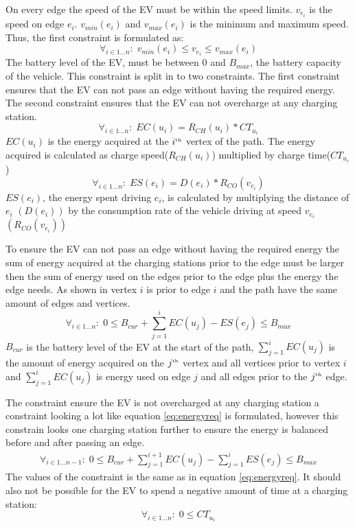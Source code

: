On every edge the speed of the EV must be within the speed limits. $v_{e_i}$ is the speed on edge $e_i$. $v_{min}(e_i)$ and $v_{max}(e_i)$ is the minimum and maximum speed. Thus, the first constraint is formulated as:
\begin{equation*}
\forall_{i\in1 \dots n }:\;v_{min}(e_i) \leq v_{e_i} \leq v_{max}(e_i)
\end{equation*}
The battery level of the EV, must be between $0$ and $B_{max}$, the battery capacity of the vehicle.
This constraint is split in to two constraints. The first constraint ensures that the EV can not pass an edge without having the required energy. The second constraint ensures that the EV can not overcharge at any charging station.
\begin{equation*}
\forall_{i\in1 \dots n }:\; EC(u_i) = R_{CH}(u_i) * CT_{u_i}
\end{equation*}
$EC(u_i)$ is the energy acquired at the $i^{\text{\tiny th}}$ vertex of the path. The energy acquired is calculated as charge speed($R_{CH}(u_i)$) multiplied by charge time($CT_{u_i}$)
\begin{equation*}
\forall_{i\in1 \dots n }:\; ES(e_i) = D(e_i)*R_{CO}(v_{e_i})
\end{equation*}
$ES(e_i)$, the energy spent driving $e_i$, is calculated by multiplying the distance of $e_i$ $(D(e_i))$ by the consumption rate of the vehicle driving at speed $v_{e_i}$ $(R_{CO}(v_{e_i}))$

To ensure the EV can not pass an edge without having the required energy the sum of energy acquired at the charging stations prior to the edge must be larger then the sum of energy used on the edges prior to the edge plus the energy the edge needs. As shown in  vertex $i$ is prior to edge $i$ and the path have the same amount of edges and vertices.
\begin{equation*}
\forall_{i\in1 \dots n }:\;0 \leq B_{cur} + \sum_{j=1}^{i} EC(u_j) - ES(e_j) \leq B_{max}
\end{equation*}\label{eq:energyreq}
$B_{cur}$ is the battery level of the EV at the start of the path, $ \sum_{j=1}^{i} EC(u_j)$ is the amount of energy acquired on the $j^{\text{\tiny th}}$ vertex and all vertices prior to vertex $i$ and $\sum_{j=1}^{i} EC(u_j)$ is energy used on edge $j$ and all edges prior to the $j^{\text{\tiny th}}$ edge.

The constraint ensure the EV is not overcharged at any charging station a constraint looking a lot like equation \ref{eq:energyreq} is formulated, however this constrain looks one charging station further to ensure the energy is balanced before and after passing an edge.
\begin{equation*}
\begin{aligned}
\forall_{i\in1 \dots n-1}:\;0 \leq B_{cur} + \sum_{j=1}^{i+1} EC(u_j) - \sum_{j=1}^{i} ES(e_j) \leq B_{max}
\end{aligned}
\end{equation*}
The values of the constraint is the same as in equation \ref{eq:energyreq}. It should also not be possible for the EV to spend a negative amount of time at a charging station:
\begin{equation*}
\forall_{i\in1 \dots n }:\; 0 \leq CT_{u_i}
\end{equation*}
